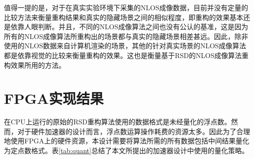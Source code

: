 \documentclass[master]{shtthesis}             %
\begin{document}
值得一提的是，对于在真实实验环境下采集的NLOS成像数据，目前并没有定量的比较方法来衡量重构结果和真实的隐藏场景之间的相似程度，即重构的效果基本还是依靠人眼判断。并且，不同的NLOS成像算法之间也没有公认的基准，这是因为所有的NLOS成像算法所重构出的场景都与真实的隐藏场景相差甚远。因此，除非使用的NLOS数据来自计算机渲染的场景，其他的针对真实场景的NLOS成像算法都是依靠视觉的比较来衡量重构的效果。这也是衡量基于RSD的NLOS成像算法重构效果所用的方法\citep{Liu,Liu2019}。

\section{FPGA实现结果}

在CPU上运行的原始的RSD重构算法使用的数据格式是未经量化的浮点数。然而，对于硬件加速器的设计而言，浮点数运算操作耗费的资源太多。因此为了合理地使用FPGA上的硬件资源，本设计需要将算法所需的所有数据包括中间结果量化为定点数格式。表\ref{tab:quant}总结了本文所提出的加速器设计中使用的量化策略。

\begin{table}[!t]
    \centering
    \label{tab:quant}
\end{table}
\end{document}
